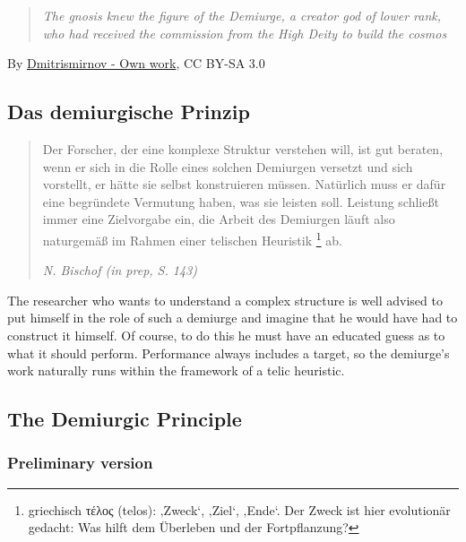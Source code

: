 \documentclass[
  letterpaper,
  DIV=11,
  numbers=noendperiod]{scrartcl}
\begin{document}
\begin{quote}
{\emph{The gnosis knew the figure of the Demiurge, a creator god of
lower rank, who had received the commission from the High Deity to build
the cosmos}}
\end{quote}

By
\href{https://commons.wikimedia.org/w/index.php?curid=28922594}{Dmitrismirnov
- Own work}, CC BY-SA 3.0

\hypertarget{das-demiurgische-prinzip}{%
\subsection{Das demiurgische Prinzip}\label{das-demiurgische-prinzip}}

\begin{quote}
Der Forscher, der eine komplexe Struktur verstehen will, ist gut
beraten, wenn er sich in die Rolle eines solchen Demiurgen versetzt und
sich vorstellt, er hätte sie selbst konstruieren müssen. Natürlich muss
er dafür eine begründete Vermutung haben, was sie leisten soll. Leistung
schließt immer eine Zielvorgabe ein, die Arbeit des Demiurgen läuft also
naturgemäß im Rahmen einer telischen Heuristik \footnote{griechisch
  τέλος (telos): ‚Zweck`, ‚Ziel`, ‚Ende`. Der Zweck ist hier evolutionär
  gedacht: Was hilft dem Überleben und der Fortpflanzung?} ab.

\emph{N. Bischof (in prep, S. 143)}
\end{quote}

{The researcher who wants to understand a complex structure is well
advised to put himself in the role of such a demiurge and imagine that
he would have had to construct it himself. Of course, to do this he must
have an educated guess as to what it should perform. Performance always
includes a target, so the demiurge's work naturally runs within the
framework of a telic heuristic.}

\hypertarget{the-demiurgic-principle}{%
\subsection{The Demiurgic Principle}\label{the-demiurgic-principle}}

\hypertarget{preliminary-version}{%
\subsubsection{Preliminary version}\label{preliminary-version}}
\end{document}
